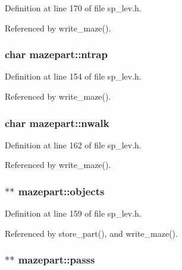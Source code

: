Definition at line 170 of file sp\+\_\+lev.\+h.



Referenced by write\+\_\+maze().

\hypertarget{structmazepart_ac5d5c8f643ddbdaa4c140a9d9d1e4ac1}{
\subsubsection[{ntrap}]{\setlength{\rightskip}{0pt plus 5cm}char mazepart\+::ntrap}}\label{structmazepart_ac5d5c8f643ddbdaa4c140a9d9d1e4ac1}


Definition at line 154 of file sp\+\_\+lev.\+h.



Referenced by write\+\_\+maze().

\hypertarget{structmazepart_adbaeae6d140fd6f0e26fcf770724ea43}{
\subsubsection[{nwalk}]{\setlength{\rightskip}{0pt plus 5cm}char mazepart\+::nwalk}}\label{structmazepart_adbaeae6d140fd6f0e26fcf770724ea43}


Definition at line 162 of file sp\+\_\+lev.\+h.



Referenced by write\+\_\+maze().

\hypertarget{structmazepart_a7c291d9120d934c18132388c03e2d81e}{
\subsubsection[{objects}]{$\ast$$\ast$ mazepart\+::objects}}\label{structmazepart_a7c291d9120d934c18132388c03e2d81e}


Definition at line 159 of file sp\+\_\+lev.\+h.



Referenced by store\+\_\+part(), and write\+\_\+maze().

\hypertarget{structmazepart_a166291a6c614004ebc26c995ab1b5ac4}{
\subsubsection[{passs}]{$\ast$$\ast$ mazepart\+::passs}}\label{structmazepart_a166291a6c614004ebc26c995ab1b5ac4}


